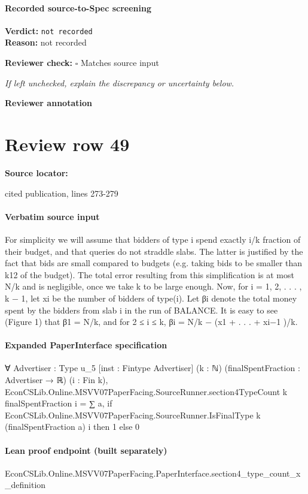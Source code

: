 \documentclass[10pt]{article}
\newcommand{\reviewerbox}{%
  \par\noindent\fbox{\parbox{0.96\linewidth}{\rule{0pt}{0.38in}}}\par
}
\newcommand{\reviewmatch}[1]{%
  \par\noindent\textbf{Reviewer check:} $\square$\; #1\par
  \noindent\emph{If left unchecked, explain the discrepancy or uncertainty below.}\par
}
\begin{document}
\paragraph{Recorded source-to-Spec screening}
\textbf{Verdict:} \texttt{not recorded}
\\
\textbf{Reason:} not recorded
\reviewmatch{Matches source input}
\noindent\textbf{Reviewer annotation}\par
\reviewerbox
\clearpage
\hypertarget{source-claim-3596aa5518094920}{}
\section*{Review row 49}
\textbf{Source locator:} {\footnotesize\raggedright cited publication, lines 273-\allowbreak{}279\par}
\paragraph{Verbatim source input}
\begin{ReviewVerbatim}
For simplicity we will assume that bidders of type i spend exactly i/k fraction of their budget,
and that queries do not straddle slabs. The latter is justified by the fact that bids are small
compared to budgets (e.g. taking bids to be smaller than k12 of the budget). The total error
resulting from this simplification is at most N/k and is negligible, once we take k to be large
enough. Now, for i = 1, 2, . . . , k − 1, let xi be the number of bidders of type(i). Let βi denote
the total money spent by the bidders from slab i in the run of BALANCE. It is easy to see
(Figure 1) that β1 = N/k, and for 2 ≤ i ≤ k, βi = N/k − (x1 + . . . + xi−1 )/k.
\end{ReviewVerbatim}


\paragraph{Expanded PaperInterface specification}
\begin{ReviewVerbatim}
∀ {Advertiser : Type u_5} [inst : Fintype Advertiser] (k : ℕ) (finalSpentFraction : Advertiser → ℝ) (i : Fin k),
  EconCSLib.Online.MSVV07PaperFacing.SourceRunner.section4TypeCount k finalSpentFraction i =
    ∑ a, if EconCSLib.Online.MSVV07PaperFacing.SourceRunner.IsFinalType k (finalSpentFraction a) i then 1 else 0
\end{ReviewVerbatim}

\paragraph{Lean proof endpoint (built separately)}\begin{ReviewVerbatim}
EconCSLib.Online.MSVV07PaperFacing.PaperInterface.section4_type_count_x_definition
\end{ReviewVerbatim}
\end{document}

